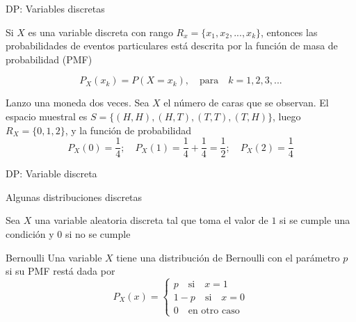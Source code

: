 \documentclass{beamer}
\begin{document}
\begin{frame}{DP: Variables discretas}

Si $X$ es una variable discreta con rango $R_x=\{x_1,x_2,...,x_k\}$, entonces las probabilidades de eventos particulares está descrita por la función de masa de probabilidad (PMF)

\begin{equation*}
    P_X(x_k)=P(X=x_k), \quad \text{para} \quad k=1,2,3,...
\end{equation*}

Lanzo una moneda dos veces. Sea $X$ el número de caras que se observan. El espacio muestral es $S=\{(H,H),(H,T),(T,T),(T,H)\}$, luego $R_X=\{0,1,2\}$, y la función de probabilidad 
\begin{equation*}
P_X(0)=\dfrac{1}{4}; \quad P_X(1)=\dfrac{1}{4}+\dfrac{1}{4}=\dfrac{1}{2}; \quad P_X(2)=\dfrac{1}{4}    
\end{equation*}

\end{frame}

\begin{frame}{DP: Variable discreta}
    
\end{frame}
\begin{frame}{Algunas distribuciones discretas}

Sea $X$ una variable aleatoria discreta tal que toma el valor de $1$ si se cumple una condición y $0$ si no se cumple

\begin{block}{Bernoulli}
    Una variable $X$ tiene una distribución de Bernoulli con el parámetro $p$ si su PMF restá dada por
    \begin{equation*}
    P_X(x)=
        \begin{cases}
p \quad \text{si} \quad x=1\\
1-p \quad \text{si} \quad x=0\\
0 \quad \text{en otro caso}
        \end{cases}
    \end{equation*}
\end{block}
    
\end{frame}
\end{document}
